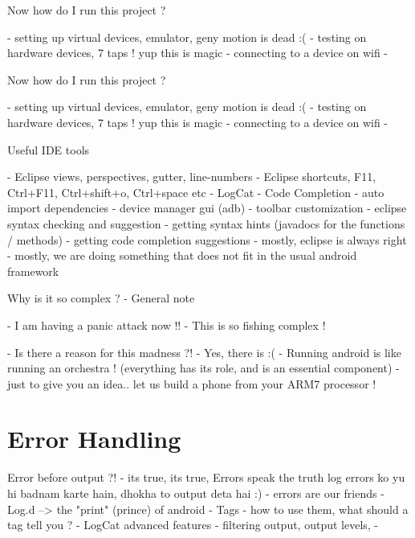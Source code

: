 \documentclass[11pt]{beamer}
\begin{document}
\begin{frame}[containsverbatim]{Now how do I run this project ?}

- setting up virtual devices, emulator, geny motion is dead :(
- testing on hardware devices, 7 taps ! yup this is magic
- connecting to a device on wifi 
- 
\end{frame}

\begin{frame}[containsverbatim]{Now how do I run this project ?}

- setting up virtual devices, emulator, geny motion is dead :(
- testing on hardware devices, 7 taps ! yup this is magic
- connecting to a device on wifi 
- 
\end{frame}


\begin{frame}[containsverbatim]{Useful IDE tools}

- Eclipse views, perspectives, gutter, line-numbers
- Eclipse shortcuts, F11, Ctrl+F11, Ctrl+shift+o, Ctrl+space etc
- LogCat
- Code Completion
- auto import dependencies
- device manager gui (adb)
- toolbar customization
- eclipse syntax checking and suggestion
- getting syntax hints (javadocs for the functions / methods)
- getting code completion suggestions
- mostly, eclipse is always right
- mostly, we are doing something that does not fit in the usual android framework

\end{frame}


\begin{frame}[containsverbatim]{Why is it so complex ? - General note}

- I am having a panic attack now !!
- This is so fishing complex ! 

- Is there a reason for this madness ?!
- Yes, there is :(
- Running android is like running an orchestra !
(everything has its role, and is an essential component)
- just to give you an idea.. let us build a phone from your ARM7 processor !

\end{frame}

\section{Error Handling}

\begin{frame}[containsverbatim]{Error before output ?!}
- its true, its true, Errors speak the truth
log errors ko yu hi badnam karte hain, dhokha to output deta hai :)
- errors are our friends
- Log.d --> the "print" (prince) of android 
- Tags - how to use them, what should a tag tell you ?
- LogCat advanced features - filtering output, output levels, 
- 

\end{frame}
\end{document}
